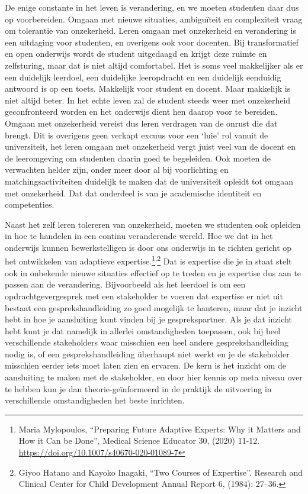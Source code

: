 \documentclass{jote-book}
\begin{document}
	De enige constante in het leven is verandering, en we moeten studenten daar dus op voorbereiden. Omgaan met nieuwe situaties, ambiguïteit en complexiteit vraag om tolerantie van onzekerheid. Leren omgaan met onzekerheid en verandering is een uitdaging voor studenten, en overigens ook voor docenten. Bij transformatief en open onderwijs wordt de student uitgedaagd en krijgt deze ruimte en zelfsturing, maar dat is niet altijd comfortabel. Het is soms veel makkelijker als er een duidelijk leerdoel, een duidelijke leeropdracht en een duidelijk eenduidig antwoord is op een toets. Makkelijk voor student en docent. Maar makkelijk is niet altijd beter. In het echte leven zal de student steeds weer met onzekerheid geconfronteerd worden en het onderwijs dient hen daarop voor te bereiden. Omgaan met onzekerheid vereist dus leren verdragen van de onrust die dat brengt. Dit is overigens geen verkapt excuus voor een ‘luie' rol vanuit de universiteit, het leren omgaan met onzekerheid vergt juist veel van de docent en de leeromgeving om studenten daarin goed te begeleiden. Ook moeten de verwachten helder zijn, onder meer door al bij voorlichting en matchingsactiviteiten duidelijk te maken dat de universiteit opleidt tot omgaan met onzekerheid. Dat dat onderdeel is van je academische identiteit en competenties.



	Naast het zelf leren tolereren van onzekerheid, moeten we studenten ook opleiden in hoe te handelen in een continu veranderende wereld. Hoe we dat in het onderwijs kunnen bewerkstelligen is door ons onderwijs in te richten gericht op het ontwikkelen van adaptieve expertise.\footnote{Maria Mylopoulos, “Preparing Future Adaptive Experts: Why it Matters and How it Can be Done”, Medical Science Educator 30, (2020) 11-12. \href{https://doi.org/10.1007/s40670-020-01089-7}{https://doi.org/10.1007/s40670-020-01089-7}}\textsuperscript{,}\footnote{Giyoo Hatano and Kayoko Inagaki, “Two Courses of Expertise”. Research and Clinical Center for Child Development Annual Report 6, (1984): 27--36.} Dat is expertise die je in staat stelt ook in onbekende nieuwe situaties effectief op te treden en je expertise dus aan te passen aan de verandering. Bijvoorbeeld als het leerdoel is om een opdrachtgevergesprek met een stakeholder te voeren dat expertise er niet uit bestaat een gesprekshandleiding zo goed mogelijk te hanteren, maar dat je inzicht hebt in hoe je aansluiting kunt vinden bij je gesprekspartner. Als je dat inzicht hebt kunt je dat namelijk in allerlei omstandigheden toepassen, ook bij heel verschillende stakeholders waar misschien een heel andere gesprekshandleiding nodig is, of een gesprekshandleiding überhaupt niet werkt en je de stakeholder misschien eerder iets moet laten zien en ervaren. De kern is het inzicht om de aansluiting te maken met de stakeholder, en door hier kennis op meta niveau over te hebben kun je dan theorie-geïnformeerd in de praktijk de uitvoering in verschillende omstandigheden het beste inrichten.
\end{document}
